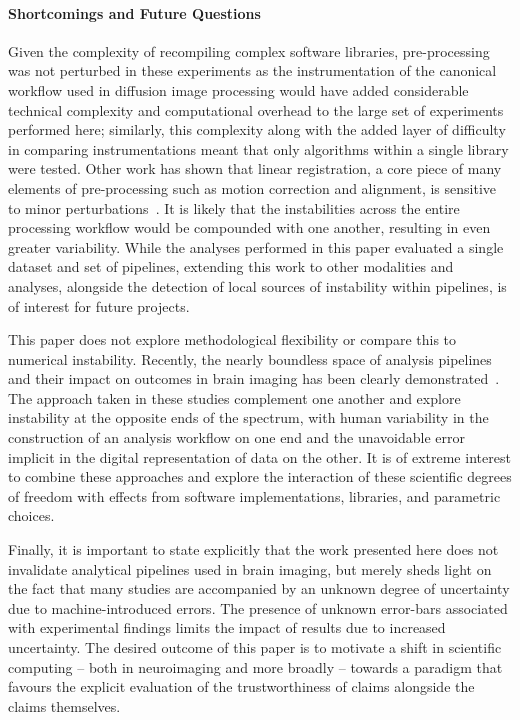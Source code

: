 \documentclass[fleqn,10pt]{SelfArx} %
\newcommand{\new}[1]{{#1}}
\newcommand{\newtwo}[1]{{#1}}
\begin{document}
\paragraph{Shortcomings and Future Questions}
Given the complexity of recompiling complex software libraries, pre-processing was not perturbed in these experiments
\new{as the instrumentation of the canonical workflow used in diffusion image processing would have added considerable
technical complexity and computational overhead to the large set of experiments performed here}\newtwo{; similarly, this
complexity along with the added layer of difficulty in comparing instrumentations meant that only algorithms within a
single library were tested}.
Other work has shown that linear registration, a core piece of many elements of pre-processing such as motion
correction and alignment, is sensitive to minor perturbations~\cite{Glatard2015-vc}. It is likely that the
instabilities across the entire processing workflow would be compounded with one another, resulting in even greater
variability. While the analyses performed in this paper evaluated a single dataset and set of pipelines, extending this
work to other modalities and analyses, \new{alongside the detection of local sources of instability within pipelines},
is of interest for future projects.

This paper does not explore methodological flexibility or compare this to numerical instability. Recently, the nearly
boundless space of analysis pipelines and their impact on outcomes in brain imaging has been clearly
demonstrated~\cite{botvinik2020variability}. The approach taken in these studies complement one another and explore
instability at the opposite ends of the spectrum, with human variability in the construction of an analysis workflow on
one end and the unavoidable error implicit in the digital representation of data on the other. It is of extreme
interest to combine these approaches and explore the interaction of these scientific degrees of freedom with effects
from software implementations, libraries, and parametric choices.

Finally, it is important to state explicitly that the work presented here does not invalidate analytical pipelines used
in brain imaging, but merely sheds light on the fact that many studies are accompanied by an unknown degree of
uncertainty due to machine-introduced errors. The presence of unknown error-bars associated with experimental findings
limits the impact of results due to increased uncertainty. The desired outcome of this paper is to motivate a shift in
scientific computing – both in neuroimaging and more broadly – towards a paradigm \new{that} favours the explicit evaluation
of the trustworthiness of claims alongside the claims themselves.
\end{document}
